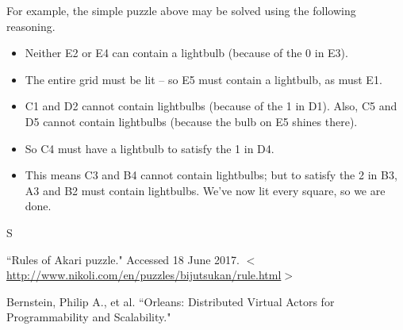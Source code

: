 \documentclass[12pt, a4paper]{article}
\begin{document}
For example, the simple puzzle above may be solved using the following reasoning.
\begin{itemize}
\item Neither E2 or E4 can contain a lightbulb (because of the 0 in E3).
\item The entire grid must be lit -- so E5 must contain a lightbulb, as must E1.
\item C1 and D2 cannot contain lightbulbs (because of the 1 in D1). Also, C5 and D5
cannot contain lightbulbs (because the bulb on E5 shines there).
\item So C4 must have a lightbulb to satisfy the 1 in D4.
\item This means C3 and B4 cannot contain lightbulbs; but to satisfy the 2 in B3,
A3 and B2 must contain lightbulbs. We've now lit every square, so we are done.
\end{itemize}

S

\newpage
\begin{thebibliography}{9}
``Rules of Akari puzzle." Accessed 18 June 2017. $<$\url{http://www.nikoli.com/en/puzzles/bijutsukan/rule.html}$>$

Bernstein, Philip A., et al. ``Orleans: Distributed Virtual Actors for Programmability and Scalability."
\end{thebibliography}

\newpage
\end{document}
